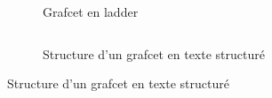 \begin{figure}[h]
  \begin{subfigure}{0.3\textwidth}
    
    \caption{Grafcet en ladder}
  \end{subfigure}
  \hfill
  \begin{subfigure}{0.65\textwidth}
    \inputminted{C}{texteStructure/structureGrafcet.c}
    \caption{Structure d'un grafcet en texte structuré}
  \end{subfigure}
  \caption{Structure d'un grafcet en texte structuré}
\end{figure}
